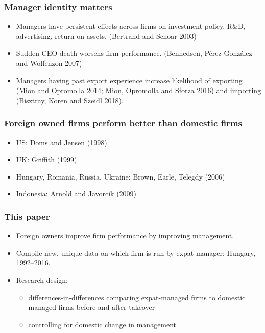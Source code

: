 \documentclass[aspectratio=169,compress,mathserif]{beamer}
\begin{document}
\begin{frame}\frametitle{Manager identity matters}\hypertarget{Manager identity matters}{}
\begin{itemize}
\item Managers have persistent effects across firms on investment policy, R\&D, advertising, return on assets.  (Bertrand and Schoar 2003)

\item Sudden CEO death worsens firm performance. (Bennedsen, Pérez-González and Wolfenzon 2007) 

\item Managers having past export experience increase likelihood of exporting (Mion and Opromolla 2014; Mion, Opromolla and Sforza 2016) and importing (Bisztray, Koren and Szeidl 2018).


\end{itemize}
\end{frame}



\begin{frame}\frametitle{Foreign owned firms perform better than domestic firms}\hypertarget{Foreign owned firms perform better than domestic firms}{}
\begin{itemize}
\item US: Doms and Jensen (1998)

\item UK: Griffith (1999)

\item Hungary, Romania, Russia, Ukraine: Brown, Earle, Telegdy (2006)

\item Indonesia: Arnold and Javorcik (2009)




\end{itemize}
\end{frame}



\begin{frame}\frametitle{This paper}\hypertarget{This paper}{}
\begin{itemize}
\item Foreign owners improve firm performance by improving management.

\item Compile new, unique data on which firm is run by expat manager: Hungary, 1992--2016. 

\item Research design: 
\begin{itemize}
\item differences-in-differences comparing expat-managed firms to domestic managed firms before and after takeover

\item controlling for domestic change in management


\end{itemize}

\end{itemize}
\end{frame}
\end{document}

